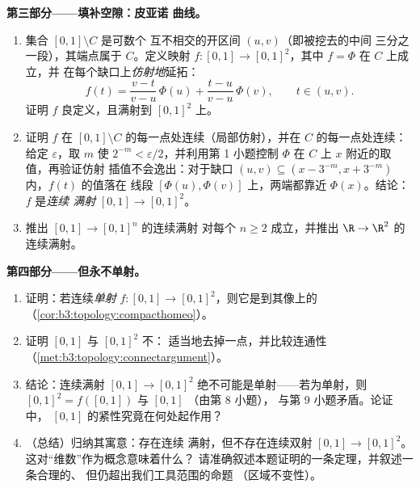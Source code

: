 \begin{problem}
\medskip
\noindent\textbf{第三部分——填补空隙：皮亚诺
曲线。}
\begin{enumerate}[resume]
  \item 集合 $[0,1] \setminus C$ 是可数个
        互不相交的开区间 $(u, v)$（即被挖去的中间
        三分之一段），其端点属于 $C$。定义映射 $f \colon
        [0,1] \to [0,1]^2$，其中 $f = \Phi$ 在 $C$ 上成立，并
        在每个缺口上\emph{仿射地}延拓：
        \[
        f(t) = \frac{v - t}{v - u}\,\Phi(u) +
        \frac{t - u}{v - u}\,\Phi(v),
        \qquad t \in (u, v).
        \]
        证明 $f$ 良定义，且满射到
        $[0,1]^2$ 上。
  \item 证明 $f$ 在 $[0,1]
        \setminus C$ 的每一点处连续（局部仿射），并在
        $C$ 的每一点处连续：给定 $\varepsilon$，取 $m$ 使 $2^{-m} <
        \varepsilon/2$，并利用第 1 小题控制 $\Phi$ 在
        $C$ 上 $x$ 附近的取值，再验证仿射
        插值不会逸出：对于缺口 $(u,v) \subseteq
        (x - 3^{-m}, x + 3^{-m})$ 内，$f(t)$ 的值落在
        线段 $[\Phi(u), \Phi(v)]$ 上，两端都靠近
        $\Phi(x)$。结论：$f$ 是\emph{连续
        满射} $[0,1] \to [0,1]^2$。
  \item 推出 $[0,1] \to [0,1]^n$ 的连续满射
        对每个 $n \geq 2$ 成立，并推出 $\R \to \R^2$ 的连续满射。
\end{enumerate}

\medskip
\noindent\textbf{第四部分——但永不单射。}
\begin{enumerate}[resume]
  \item 证明：若连续\emph{单射} $f \colon [0,1]
        \to [0,1]^2$，则它是到其像上的
        （\cref{cor:b3:topology:compacthomeo}）。
  \item 证明 $[0,1]$ 与 $[0,1]^2$ 不：
        适当地去掉一点，并比较连通性
        （\cref{met:b3:topology:connectargument}）。
  \item 结论：连续满射 $[0,1] \to [0,1]^2$
        绝不可能是单射——若为单射，则
        $[0,1]^2 = f([0,1])$ 与 $[0,1]$ （由第 8 小题），
        与第 9 小题矛盾。论证中，
        $[0,1]$ 的紧性究竟在何处起作用？
  \item （总结）归纳其寓意：存在连续
        满射，但不存在连续双射 $[0,1] \to
        [0,1]^2$。这对“维数”作为概念意味着什么？
        请准确叙述本题证明的一条定理，并叙述一条合理的、
        但仍超出我们工具范围的命题
        （区域不变性）。
\end{enumerate}


\end{problem}
